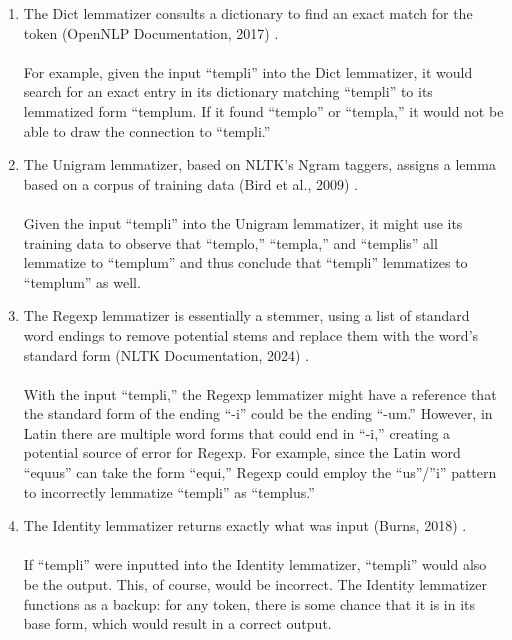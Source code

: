 \documentclass[11pt]{article}
\begin{document}
\begin{enumerate}
  \item The Dict lemmatizer consults a dictionary to find an exact match for the token (OpenNLP Documentation, 2017) \cite{apache-opennlp}. \\ \\
For example, given the input “templi” into the Dict lemmatizer, it would search for an exact entry in its dictionary matching “templi” to its lemmatized form “templum. If it found “templo”  or “templa,” it would not be able to draw the connection to “templi.” 

  \item The Unigram lemmatizer, based on NLTK’s Ngram taggers, assigns a lemma based on a corpus of training data (Bird et al., 2009) \cite{bird-et-al}. \\ \\
Given the input “templi” into the Unigram lemmatizer, it might use its training data to observe that “templo,” “templa,” and “templis” all lemmatize to “templum” and thus conclude that “templi” lemmatizes to “templum” as well.

  \item The Regexp lemmatizer is essentially a stemmer, using a list of standard word endings to remove potential stems and replace them with the word’s standard form (NLTK Documentation, 2024) \cite{nltk_proj}. \\ \\

  With the input “templi,” the Regexp lemmatizer might have a reference that the standard form of the ending “-i” could be the ending “-um.” However, in Latin there are multiple word forms that could end in “-i,” creating a potential source of error for Regexp. For example, since the Latin word “equus” can take the form “equi,” Regexp could employ the “us”/”i” pattern to incorrectly lemmatize “templi” as “templus.”


  \item The Identity lemmatizer returns exactly what was input (Burns, 2018) \cite{philological}. \\ \\
  If “templi” were inputted into the Identity lemmatizer, “templi” would also be the output. This, of course, would be incorrect. The Identity lemmatizer functions as a backup: for any token, there is some chance that it is in its base form, which would result in a correct output.

\end{enumerate}
\end{document}
